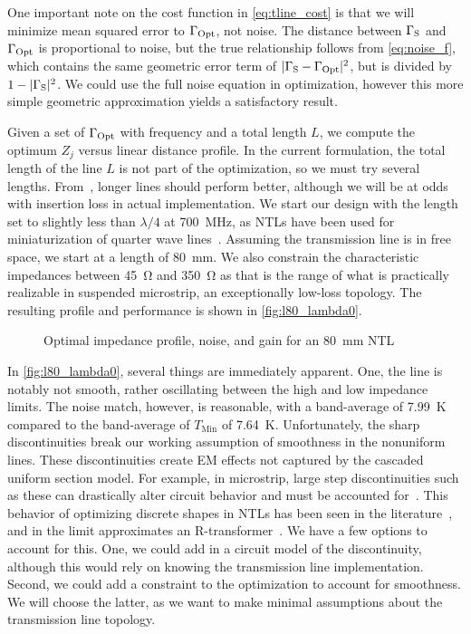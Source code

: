 One important note on the cost function in \autoref{eq:tline_cost} is that we will minimize mean squared error to $\Gamma_{\text{Opt}}$, not noise.
The distance between $\Gamma_{\text{S}}$ and $\Gamma_{\text{Opt}}$ is proportional to noise, but the true relationship follows from \autoref{eq:noise_f}, which contains the same geometric error term of $|\Gamma_{\text{S}} - \Gamma_{\text{Opt}}|^2$, but is divided by $1-|\Gamma_{\text{S}}|^2$.
We could use the full noise equation in optimization, however this more simple geometric approximation yields a satisfactory result.

Given a set of $\Gamma_{\text{Opt}}$ with frequency and a total length $L$, we compute the optimum $Z_j$ versus linear distance profile.
In the current formulation, the total length of the line $L$ is not part of the optimization, so we must try several lengths.
From~\cite{xiaoImpedanceMatchingComplex2002}, longer lines should perform better, although we will be at odds with insertion loss in actual implementation.
We start our design with the length set to slightly less than $\lambda/4$ at \qty{700}{\MHz}, as NTLs have been used for miniaturization of quarter wave lines~\cite{khalaj-amirhosseiniNonuniformTransmissionLines2008}.
Assuming the transmission line is in free space, we start at a length of \qty{80}{\mm}.
We also constrain the characteristic impedances between \qty{45}{\ohm} and \qty{350}{\ohm} as that is the range of what is practically realizable in suspended microstrip, an exceptionally low-loss topology.
The resulting profile and performance is shown in \autoref{fig:l80_lambda0}.
%
\begin{figure}[ht!]%
    \centering
    \subfloat{}%
    \quad%
    \subfloat{}%
    \caption{Optimal impedance profile, noise, and gain for an \qty{80}{\mm} NTL}%
    \label{fig:l80_lambda0}%
\end{figure}

In \autoref{fig:l80_lambda0}, several things are immediately apparent.
One, the line is notably not smooth, rather oscillating between the high and low impedance limits.
The noise match, however, is reasonable, with a band-average of \qty{7.99}{\K} compared to the band-average of $T_\text{Min}$ of \qty{7.64}{\K}.
Unfortunately, the sharp discontinuities break our working assumption of smoothness in the nonuniform lines.
These discontinuities create EM effects not captured by the cascaded uniform section model.
For example, in microstrip, large step discontinuities such as these can drastically alter circuit behavior and must be accounted for~\cite{edwardsDiscontinuitiesMicrostrip2016}.
This behavior of optimizing discrete shapes in NTLs has been seen in the literature~\cite{miazgaDiscreteShapeOptimization2008}, and in the limit approximates an R-transformer~\cite{rosloniecDesignSteppedTransmission1994}.
We have a few options to account for this.
One, we could add in a circuit model of the discontinuity, although this would rely on knowing the transmission line implementation.
Second, we could add a constraint to the optimization to account for smoothness.
We will choose the latter, as we want to make minimal assumptions about the transmission line topology.

